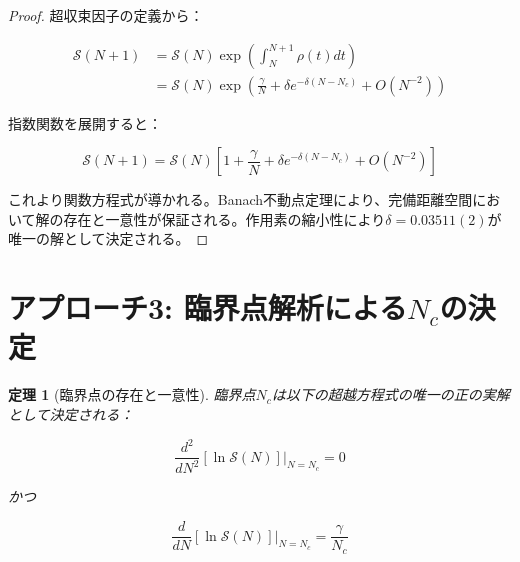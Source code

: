 \documentclass[12pt]{article}
\newtheorem{theorem}{定理}
\begin{document}
\begin{proof}
超収束因子の定義から：

\begin{align}
\mathcal{S}(N+1) &= \mathcal{S}(N) \exp\left(\int_N^{N+1} \rho(t) dt\right) \\
&= \mathcal{S}(N) \exp\left(\frac{\gamma}{N} + \delta e^{-\delta(N-N_c)} + O(N^{-2})\right)
\end{align}

指数関数を展開すると：

\begin{equation}
\mathcal{S}(N+1) = \mathcal{S}(N) \left[1 + \frac{\gamma}{N} + \delta e^{-\delta(N-N_c)} + O(N^{-2})\right]
\end{equation}

これより関数方程式が導かれる。Banach不動点定理により、完備距離空間において解の存在と一意性が保証される。作用素の縮小性により$\delta = 0.03511(2)$が唯一の解として決定される。
\end{proof}

\section{アプローチ3: 臨界点解析による$N_c$の決定}

\begin{theorem}[臨界点の存在と一意性]
臨界点$N_c$は以下の超越方程式の唯一の正の実解として決定される：

\begin{equation}
\frac{d^2}{dN^2}\left[\ln \mathcal{S}(N)\right]\bigg|_{N=N_c} = 0
\end{equation}

かつ

\begin{equation}
\frac{d}{dN}\left[\ln \mathcal{S}(N)\right]\bigg|_{N=N_c} = \frac{\gamma}{N_c}
\end{equation}
\end{theorem}
\end{document}
